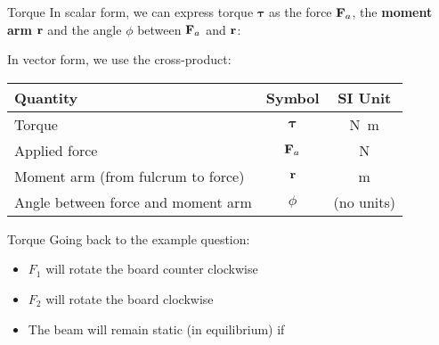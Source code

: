 \documentclass[12pt,compress,aspectratio=169]{beamer}
\newcommand{\mb}[1]{\ensuremath\mathbf{#1}}
\newcommand{\eq}[2]{\vspace{#1}{\Large\begin{displaymath}#2\end{displaymath}}}
\begin{document}
\begin{frame}{Torque}
  In scalar form, we can express torque $\bm{\tau}$ as the force $\mb{F}_a$,
  the \textbf{moment arm} $\mb{r}$ and the angle $\phi$ between $\mb{F}_a$ and
  $\mb{r}$:

  \eq{-.2in}{
    \boxed{\tau=rF_a\sin\phi}
  }
  
  In vector form, we use the cross-product:

  \eq{-.2in}{
    \boxed{\bm{\tau}=\mb{r}\times\mb{F}_a}
  }
  \begin{center}
    \begin{tabular}{l|c|c}
      \rowcolor{pink}
      \textbf{Quantity} & \textbf{Symbol} & \textbf{SI Unit} \\ \hline
      Torque        & $\bm{\tau}$ & \si{\newton\metre} \\
      Applied force & $\mb{F}_a$  & \si{\newton} \\
      Moment arm (from fulcrum to force) & $\mb{r}$ & \si{\metre}\\
      Angle between force and moment arm & $\phi$ & (no units)
    \end{tabular}
  \end{center}
\end{frame}



\begin{frame}{Torque}
  Going back to the example question:
  \begin{center}
  \end{center}
  \begin{itemize}
  \item<2->$F_1$ will rotate the board counter clockwise
  \item<3->$F_2$ will rotate the board clockwise
  \item<4->The beam will remain static (in equilibrium) if

    \eq{-.2in}{ F_1d_1=F_2d_2 }
  \end{itemize}
\end{frame}
\end{document}
